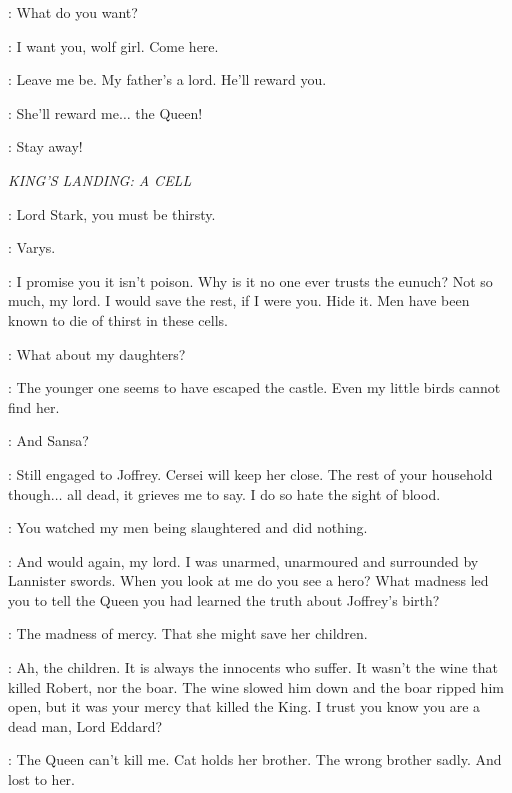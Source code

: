\ARYA: What do you want? 

\BOY: I want you, wolf girl. Come here. 

\ARYA: Leave me be. My father's a lord. He'll reward you. 

\BOY: She'll reward me$\ldots$ the Queen! 

\ARYA: Stay away! 



\scene

\textit{KING'S LANDING: A CELL} 


\VARYS: Lord Stark, you must be thirsty. 

\NED: Varys. 


\VARYS: I promise you it isn't poison. Why is it no one ever trusts the eunuch?
 Not so much, my lord. I would save the rest, if I were you. Hide it. Men have been known to die of thirst in these cells. 

\NED: What about my daughters? 

\VARYS: The younger one seems to have escaped the castle. Even my little birds cannot find her. 

\NED: And Sansa? 

\VARYS: Still engaged to Joffrey. Cersei will keep her close. The rest of your household though$\ldots$ all dead, it grieves me to say. I do so hate the sight of blood. 

\NED: You watched my men being slaughtered and did nothing. 

\VARYS: And would again, my lord. I was unarmed, unarmoured and surrounded by Lannister swords. When you look at me do you see a hero? What madness led you to tell the Queen you had learned the truth about Joffrey's birth? 

\NED: The madness of mercy. That she might save her children. 

\VARYS: Ah, the children. It is always the innocents who suffer. It wasn't the wine that killed Robert, nor the boar. The wine slowed him down and the boar ripped him open, but it was your mercy that killed the King. I trust you know you are a dead man, Lord Eddard? 

\NED: The Queen can't kill me. Cat holds her brother. The wrong brother sadly. And lost to her. 

